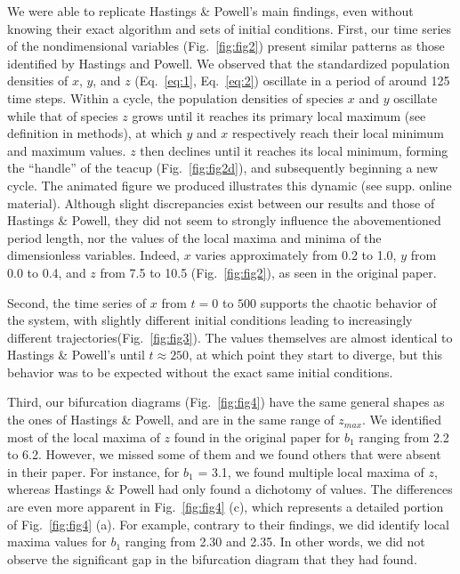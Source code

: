 \documentclass[
]{article}
\begin{document}
We were able to replicate Hastings \& Powell's main findings, even
without knowing their exact algorithm and sets of initial conditions.
First, our time series of the nondimensional variables
(Fig.~\ref{fig:fig2}) present similar patterns as those identified by
Hastings and Powell. We observed that the standardized population
densities of \(x\), \(y\), and \(z\) (Eq.~\ref{eq:1}, Eq.~\ref{eq:2})
oscillate in a period of around 125 time steps. Within a cycle, the
population densities of species \(x\) and \(y\) oscillate while that of
species \(z\) grows until it reaches its primary local maximum (see
definition in methods), at which \(y\) and \(x\) respectively reach
their local minimum and maximum values. \(z\) then declines until it
reaches its local minimum, forming the ``handle'' of the teacup
(Fig.~\ref{fig:fig2d}), and subsequently beginning a new cycle. The
animated figure we produced illustrates this dynamic (see supp. online
material). Although slight discrepancies exist between our results and
those of Hastings \& Powell, they did not seem to strongly influence the
abovementioned period length, nor the values of the local maxima and
minima of the dimensionless variables. Indeed, \(x\) varies
approximately from 0.2 to 1.0, \(y\) from 0.0 to 0.4, and \(z\) from 7.5
to 10.5 (Fig.~\ref{fig:fig2}), as seen in the original paper.

Second, the time series of \(x\) from \(t = 0\) to \(500\) supports the
chaotic behavior of the system, with slightly different initial
conditions leading to increasingly different
trajectories(Fig.~\ref{fig:fig3}). The values themselves are almost
identical to Hastings \& Powell's until \(t \approx 250\), at which
point they start to diverge, but this behavior was to be expected
without the exact same initial conditions.

Third, our bifurcation diagrams (Fig.~\ref{fig:fig4}) have the same
general shapes as the ones of Hastings \& Powell, and are in the same
range of \(z_{max}\). We identified most of the local maxima of \(z\)
found in the original paper for \(b_1\) ranging from 2.2 to 6.2.
However, we missed some of them and we found others that were absent in
their paper. For instance, for \(b_1\) = 3.1, we found multiple local
maxima of \(z\), whereas Hastings \& Powell had only found a dichotomy
of values. The differences are even more apparent in Fig.~\ref{fig:fig4}
(c), which represents a detailed portion of Fig.~\ref{fig:fig4} (a). For
example, contrary to their findings, we did identify local maxima values
for \(b_1\) ranging from 2.30 and 2.35. In other words, we did not
observe the significant gap in the bifurcation diagram that they had
found.
\end{document}
